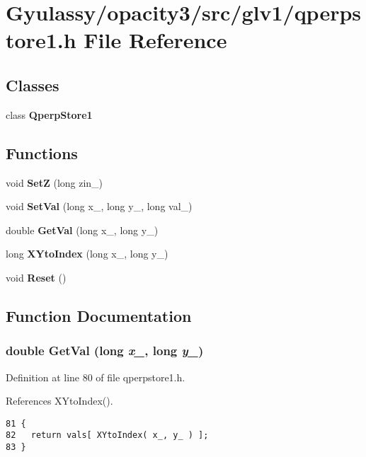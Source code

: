 \section{Gyulassy/opacity3/src/glv1/qperpstore1.h File Reference}
\label{qperpstore1_8h}
\subsection*{Classes}
\begin{CompactItemize}
\item 
class {\bf QperpStore1}
\end{CompactItemize}
\subsection*{Functions}
\begin{CompactItemize}
\item 
void {\bf SetZ} (long zin\_\-)
\item 
void {\bf SetVal} (long x\_\-, long y\_\-, long val\_\-)
\item 
double {\bf GetVal} (long x\_\-, long y\_\-)
\item 
long {\bf XYtoIndex} (long x\_\-, long y\_\-)
\item 
void {\bf Reset} ()
\end{CompactItemize}


\subsection{Function Documentation}
\subsubsection{\setlength{\rightskip}{0pt plus 5cm}double GetVal (long {\em x\_\-}, long {\em y\_\-})}\label{qperpstore1_8h_be1f66be610bdae78fdcdf045421bd11}




Definition at line 80 of file qperpstore1.h.

References XYtoIndex().

\begin{Code}\begin{verbatim}81 {
82   return vals[ XYtoIndex( x_, y_ ) ];
83 }
\end{verbatim}
\end{Code}


